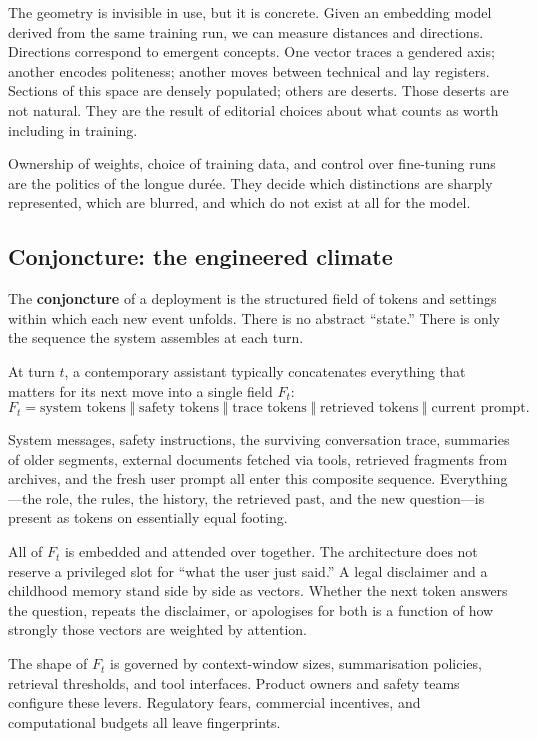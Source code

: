 \documentclass[12pt,a4paper]{article}
\begin{document}
The geometry is invisible in use, but it is concrete. Given an embedding model derived from the same training run, we can measure distances and directions. Directions correspond to emergent concepts. One vector traces a gendered axis; another encodes politeness; another moves between technical and lay registers. Sections of this space are densely populated; others are deserts. Those deserts are not natural. They are the result of editorial choices about what counts as worth including in training.

Ownership of weights, choice of training data, and control over fine-tuning runs are the politics of the longue dur\'ee. They decide which distinctions are sharply represented, which are blurred, and which do not exist at all for the model.

\subsection{Conjoncture: the engineered climate}

The \textbf{conjoncture} of a deployment is the structured field of tokens and settings within which each new event unfolds. There is no abstract ``state.'' There is only the sequence the system assembles at each turn.

At turn $t$, a contemporary assistant typically concatenates everything that matters for its next move into a single field $F_t$:
\[
F_t = \text{system tokens} \;\Vert\; \text{safety tokens} \;\Vert\; \text{trace tokens} \;\Vert\; \text{retrieved tokens} \;\Vert\; \text{current prompt}.
\]

System messages, safety instructions, the surviving conversation trace, summaries of older segments, external documents fetched via tools, retrieved fragments from archives, and the fresh user prompt all enter this composite sequence. Everything---the role, the rules, the history, the retrieved past, and the new question---is present as tokens on essentially equal footing.

All of $F_t$ is embedded and attended over together. The architecture does not reserve a privileged slot for ``what the user just said.'' A legal disclaimer and a childhood memory stand side by side as vectors. Whether the next token answers the question, repeats the disclaimer, or apologises for both is a function of how strongly those vectors are weighted by attention.

The shape of $F_t$ is governed by context-window sizes, summarisation policies, retrieval thresholds, and tool interfaces. Product owners and safety teams configure these levers. Regulatory fears, commercial incentives, and computational budgets all leave fingerprints.
\end{document}
